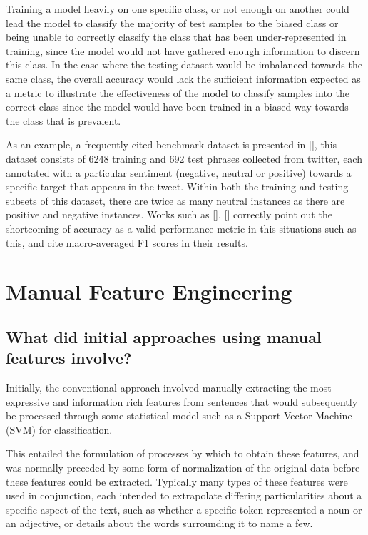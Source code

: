 \documentclass[12pt, a4paper]{report}
\theoremstyle{definition}
\theoremstyle{definition}%
\theoremstyle{definition}%
\theoremstyle{definition}%
\theoremstyle{definition}%
\theoremstyle{definition}%
\renewcommand{\cite}[1]{[\citealp{#1}]}
\begin{document}
Training a model heavily on one specific class, or not enough on another could lead the model to classify the majority of test samples to the biased class or being unable to correctly classify the class that has been under-represented in training, since the model would not have gathered enough information to discern this class. In the case where the testing dataset would be imbalanced towards the same class, the overall accuracy would lack the sufficient information expected as a metric to illustrate the effectiveness of the model to classify samples into the correct class since the model would have been trained in a biased way towards the class that is prevalent.

As an example, a frequently cited benchmark dataset is presented in \cite{dong}, this dataset consists of 6248 training and 692 test phrases collected from twitter, each annotated with a particular sentiment (negative, neutral or positive) towards a specific target that appears in the tweet. Within both the training and testing subsets of this dataset, there are twice as many neutral instances as there are positive and negative instances. Works such as \cite{chen2017}, \cite{dong} correctly point out the shortcoming of accuracy as a valid performance metric in this situations such as this, and cite macro-averaged F1 scores in their results.

\section{Manual Feature Engineering}
\subsection{What did initial approaches using manual features involve?}
Initially, the conventional approach involved manually extracting the most expressive and information rich features from sentences that would subsequently be processed through some statistical model such as a Support Vector Machine (SVM) for classification.

This entailed the formulation of processes by which to obtain these features, and was normally preceded by some form of normalization of the original data before these features could be extracted. Typically many types of these features were used in conjunction, each intended to extrapolate differing particularities about a specific aspect of the text, such as whether a specific token represented a noun or an adjective, or details about the words surrounding it to name a few.
\end{document}
